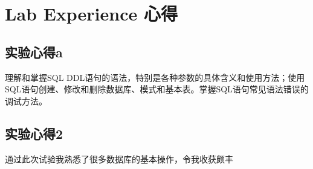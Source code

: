 \section{Lab Experience 心得}
\subsection{实验心得a}
理解和掌握SQL DDL语句的语法，特别是各种参数的具体含义和使用方法；使用SQL语句创建、修改和删除数据库、模式和基本表。掌握SQL语句常见语法错误的调试方法。
\subsection{实验心得2}
通过此次试验我熟悉了很多数据库的基本操作，令我收获颇丰
